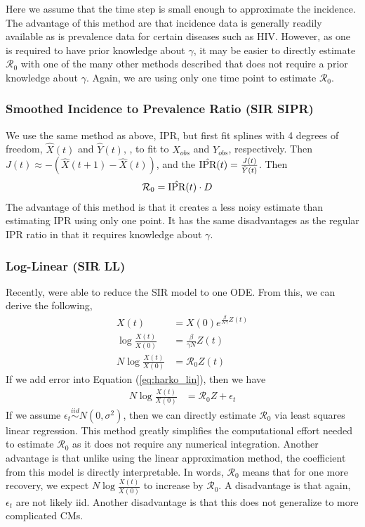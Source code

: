 \documentclass[12pt]{article}
\newcommand{\rr}{\ensuremath{\mathcal{R}_0}}
\begin{document}
Here we assume that the time step is small enough to approximate the incidence.  The advantage of this method are that incidence data is generally readily available as is prevalence data for certain diseases such as HIV.  However, as one is required to have prior knowledge about $\gamma$, it may be easier to directly estimate $\rr$ with one of the many other methods described that does not require a prior knowledge about $\gamma$.  Again, we are using only one time point to estimate $\rr$.

\subsubsection{Smoothed Incidence to Prevalence Ratio (SIR SIPR)}
We use the same method as above, IPR, but first fit splines with 4 degrees of freedom, $\hat{X}(t)$ and $\hat{Y}(t)$, , to fit to $X_{obs}$ and $Y_{obs}$, respectively.  Then  $J(t) \approx -(\hat{X}(t+1) - \hat{X}(t))$, and the $\hat{\textnormal{IPR}}(t) = \frac{J(t)}{\hat{Y}(t)}$.  Then
\begin{align*}
\rr &= \hat{\textnormal{IPR}}(t) \cdot D
\end{align*}
The advantage of this method is that it creates a less noisy estimate than estimating IPR using only one point.  It has the same disadvantages as the regular IPR ratio in that it requires knowledge about $\gamma$.

\subsubsection{Log-Linear (SIR LL)}
Recently, \cite{harko2014exact} were able to reduce the SIR model to one ODE.  From this, we can derive the following,
\begin{align}
  X(t) &=  X(0) e^{\frac{\beta}{N \gamma}Z(t)} \nonumber\\
  \log \frac{X(t)}{X(0)} &=  \frac{\beta }{\gamma N }Z(t) \nonumber\\
  N\log \frac{X(t)}{X(0)} &=  \rr Z(t) \label{eq:harko_lin}
\end{align}
If we add error into Equation (\ref{eq:harko_lin}), then we have
\begin{align}
N  \log \frac{X(t)}{X(0)} &=  \rr Z  + \epsilon_t\label{eq:r0_harko}
\end{align}
If we assume $\epsilon_t \overset{iid}{\sim}N(0, \sigma^2)$, then we can directly estimate $\rr$ via least squares linear regression.  This method greatly simplifies the computational effort needed to estimate $\rr$ as it does not require any numerical integration.  Another advantage is that unlike using the linear approximation method, the coefficient from this model is directly interpretable.  In words, $\rr$ means that for one more recovery, we expect $N \log \frac{X(t)}{X(0)}$ to increase by $\rr$.  A disadvantage is that again, $\epsilon_t$ are not likely iid.  Another disadvantage is that this does not generalize to more complicated CMs.
\end{document}
